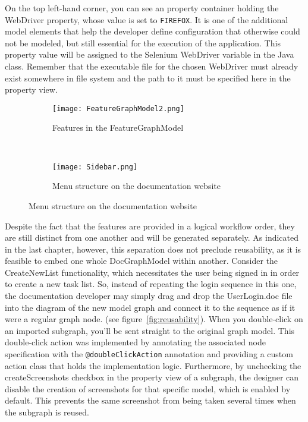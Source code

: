 On the top left-hand corner, you can see an property container holding the WebDriver property, whose value is set to \lstinline[language=MGL]{FIREFOX}. It is one of the additional model elements that help the developer define configuration that otherwise could not be modeled, but still essential for the execution of the application. This property value will be assigned to the Selenium WebDriver variable in the Java class. Remember that the executable file for the chosen WebDriver must already exist somewhere in file system and the path to it must be specified here in the property view.

\begin{figure}[H]
    \begin{subfigure}[b]{0.5\textwidth}
        \texttt{[image: FeatureGraphModel2.png]}
        \caption{Features in the FeatureGraphModel}
        \label{fig:featGraph}
    \end{subfigure}
    ~
    \begin{subfigure}[b]{0.5\textwidth}
        \texttt{[image: Sidebar.png]}
        \caption{Menu structure on the documentation website}
        \label{fig:sidebar}
    \end{subfigure}
\end{figure}

Despite the fact that the features are provided in a logical workflow order, they are still distinct from one another and will be generated separately. As indicated in the last chapter, however, this separation does not preclude reusability, as it is feasible to embed one whole DocGraphModel within another. Consider the CreateNewList functionality, which necessitates the user being signed in in order to create a new task list. So, instead of repeating the login sequence in this one, the documentation developer may simply drag and drop the UserLogin.doc file into the diagram of the new model graph and connect it to the sequence as if it were a regular graph node. (see figure~\ref{fig:reusability}). When you double-click on an imported subgraph, you'll be sent straight to the original graph model. This double-click action was implemented by annotating the associated node specification with the \lstinline[language=MGL]{@doubleClickAction} annotation and providing a custom action class that holds the implementation logic. Furthermore, by unchecking the createScreenshots checkbox in the property view of a subgraph, the designer can disable the creation of screenshots for that specific model, which is enabled by default. This prevents the same screenshot from being taken several times when the subgraph is reused.

